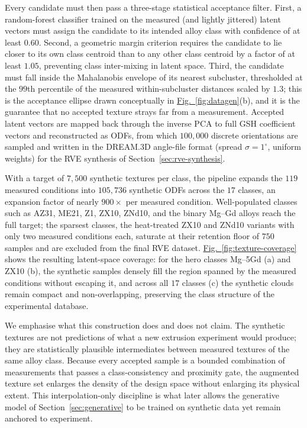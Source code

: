 \documentclass[preprint,12pt]{elsarticle}
\newcommand{\figref}[1]{\hyperref[#1]{Fig.~\ref*{#1}}}
\begin{document}
Every candidate must then pass a three-stage statistical acceptance filter. First, a random-forest classifier trained on the measured (and lightly jittered) latent vectors must assign the candidate to its intended alloy class with confidence of at least $0.60$. Second, a geometric margin criterion requires the candidate to lie closer to its own class centroid than to any other class centroid by a factor of at least $1.05$, preventing class inter-mixing in latent space. Third, the candidate must fall inside the Mahalanobis envelope of its nearest subcluster, thresholded at the $99$th percentile of the measured within-subcluster distances scaled by $1.3$; this is the acceptance ellipse drawn conceptually in \figref{fig:datagen}(b), and it is the guarantee that no accepted texture strays far from a measurement. Accepted latent vectors are mapped back through the inverse PCA to full GSH coefficient vectors and reconstructed as ODFs, from which $100{,}000$ discrete orientations are sampled and written in the DREAM.3D angle-file format (spread $\sigma = 1^{\circ}$, uniform weights) for the RVE synthesis of Section~\ref{sec:rve-synthesis}.

With a target of $7{,}500$ synthetic textures per class, the pipeline expands the $119$ measured conditions into $105{,}736$ synthetic ODFs across the $17$ classes, an expansion factor of nearly $900\times$ per measured condition. Well-populated classes such as AZ31, ME21, Z1, ZX10, ZNd10, and the binary Mg--Gd alloys reach the full target; the sparsest classes, the heat-treated ZX10 and ZNd10 variants with only two measured conditions each, saturate at their retention floor of $750$ samples and are excluded from the final RVE dataset. \figref{fig:texture-coverage} shows the resulting latent-space coverage: for the hero classes Mg--5Gd (a) and ZX10 (b), the synthetic samples densely fill the region spanned by the measured conditions without escaping it, and across all $17$ classes (c) the synthetic clouds remain compact and non-overlapping, preserving the class structure of the experimental database.

We emphasise what this construction does and does not claim. The synthetic textures are not predictions of what a new extrusion experiment would produce; they are statistically plausible intermediates between measured textures of the same alloy class. Because every accepted sample is a bounded combination of measurements that passes a class-consistency and proximity gate, the augmented texture set enlarges the density of the design space without enlarging its physical extent. This interpolation-only discipline is what later allows the generative model of Section~\ref{sec:generative} to be trained on synthetic data yet remain anchored to experiment.
\end{document}
